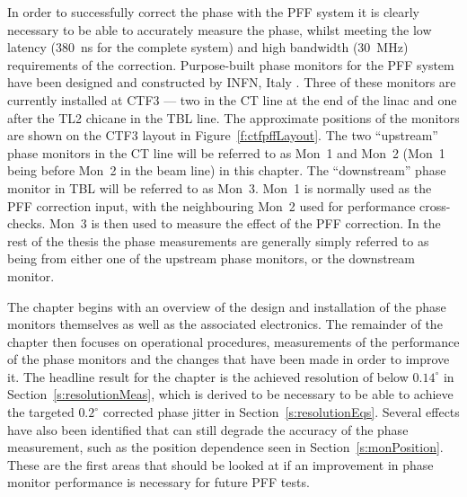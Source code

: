 
In order to successfully correct the phase with the PFF system it is clearly necessary to be able to accurately measure the phase, whilst meeting the low latency (380~ns for the complete system) and high bandwidth (30~MHz) requirements of the correction. Purpose-built phase monitors for the PFF system have been designed and constructed by INFN, Italy \cite{phMonEuCard}. Three of these monitors are currently installed at CTF3 --- two in the CT line at the end of the linac and one after the TL2 chicane in the TBL line. The approximate positions of the monitors are shown on the CTF3 layout in Figure~\ref{f:ctfpffLayout}. The two ``upstream'' phase monitors in the CT line will be referred to as Mon~1 and Mon~2 (Mon~1 being before Mon~2 in the beam line) in this chapter. The ``downstream'' phase monitor in TBL will be referred to as Mon~3. Mon~1 is normally used as the PFF correction input, with the neighbouring Mon~2 used for performance cross-checks. Mon~3 is then used to measure the effect of the PFF correction. In the rest of the thesis the phase measurements are generally simply referred to as being from either one of the upstream phase monitors, or the downstream monitor. 

The chapter begins with an overview of the design and installation of the phase monitors themselves as well as the associated electronics. The remainder of the chapter then focuses on operational procedures, measurements of the performance of the phase monitors and the changes that have been made in order to improve it. The headline result for the chapter is the achieved resolution of below \(0.14^\circ\) in Section~\ref{s:resolutionMeas}, which is derived to be necessary to be able to achieve the targeted \(0.2^\circ\) corrected phase jitter in Section~\ref{s:resolutionEqs}. Several effects have also been identified that can still degrade the accuracy of the phase measurement, such as the position dependence seen in Section~\ref{s:monPosition}. These are the first areas that should be looked at if an improvement in phase monitor performance is necessary for future PFF tests.


